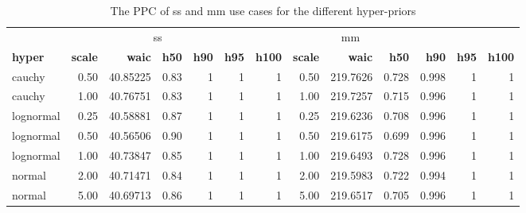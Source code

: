 \documentclass[twoside,11pt,preprint]{article}
\begin{document}
\begin{table}

\caption{\label{tab:hyperxz1}\label{tab:hyper1}The PPC of ss and mm use cases for the different hyper-priors}
\centering
\begin{tabular}[t]{lrrrrrrrrrrrr}
\toprule
\multicolumn{1}{c}{ } & \multicolumn{5}{c}{ss} & \multicolumn{5}{c}{mm} \\
\cmidrule(l{3pt}r{3pt}){2-6} \cmidrule(l{3pt}r{3pt}){7-11}
\textbf{\textbf{hyper}} & \textbf{\textbf{scale}} & \textbf{\textbf{waic}} & \textbf{\textbf{h50}} & \textbf{\textbf{h90}} & \textbf{\textbf{h95}} & \textbf{\textbf{h100}} & \textbf{\textbf{scale}} & \textbf{\textbf{waic}} & \textbf{\textbf{h50}} & \textbf{\textbf{h90}} & \textbf{\textbf{h95}} & \textbf{\textbf{h100}}\\
\midrule
cauchy & 0.50 & 40.85225 & 0.83 & 1 & 1 & 1 & 0.50 & 219.7626 & 0.728 & 0.998 & 1 & 1\\
cauchy & 1.00 & 40.76751 & 0.83 & 1 & 1 & 1 & 1.00 & 219.7257 & 0.715 & 0.996 & 1 & 1\\
lognormal & 0.25 & 40.58881 & 0.87 & 1 & 1 & 1 & 0.25 & 219.6236 & 0.708 & 0.996 & 1 & 1\\
lognormal & 0.50 & 40.56506 & 0.90 & 1 & 1 & 1 & 0.50 & 219.6175 & 0.699 & 0.996 & 1 & 1\\
lognormal & 1.00 & 40.73847 & 0.85 & 1 & 1 & 1 & 1.00 & 219.6493 & 0.728 & 0.996 & 1 & 1\\
\addlinespace
normal & 2.00 & 40.71471 & 0.84 & 1 & 1 & 1 & 2.00 & 219.5983 & 0.722 & 0.994 & 1 & 1\\
normal & 5.00 & 40.69713 & 0.86 & 1 & 1 & 1 & 5.00 & 219.6517 & 0.705 & 0.996 & 1 & 1\\
\bottomrule
\end{tabular}
\end{table}
\end{document}
